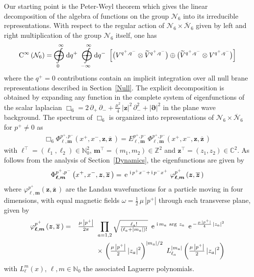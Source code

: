\documentclass[11pt,a4paper]{article}
\newcommand{\ii}{{\rm i}}
\newcommand{\mbf}[1]{{\boldsymbol {#1} }}
\def\ii{{\,{\rm i}\,}}
\def\dd{{\rm d}}
\def\mz{{\mbf z}}
\def\mm{{\mbf m}}
\def\mell{{\mbf\ell}}
\def\mdell{{\mbf\partial}}
\newcommand{\complex}{{\mathbb C}} %
\newcommand{\zed}{{\mathbb Z}} %
\newcommand{\nat}{{\mathbb N}} %
\def\e{{\,\rm e}\,}
\def\bea{\begin{eqnarray}}
\def\eea{\end{eqnarray}}
\newcommand{\beq}{\begin{eqnarray}}
\newcommand{\eeq}{\end{eqnarray}}
\begin{document}
Our starting point is the Peter-Weyl theorem which gives the
linear decomposition of the algebra of functions on the group $\mathcal{N}_6$
into its irreducible representations. With respect to the regular
action of $\mathcal{N}_6\times\overline{\mathcal{N}}_6$ given by left
and right multiplication of the group $\mathcal{N}_6$ itself, one has
\beq
{\rm C}^\infty\left(\mathcal{N}_6\right)=~{\int\limits_0^\infty
\!\!\!\!\!\!\!\!\!\!\!\!~\,\bigodot\!\!\!\!\!\!\!\!\!\!\mbf-\!\!
\mbf-}~\dd q^+~~{\int\limits_{-\infty}^\infty
\!\!\!\!\!\!\!\!\!\!\!\!~\bigodot\!\!\!\!\!\!\!\!\!\!\mbf-\!\!
\mbf-}~\dd q^-~\left[\bigl(V^{q^+,q^-}\otimes\widetilde{V}
{}^{q^+,q^-}\bigr)\oplus\bigl(\widetilde{V}
{}^{q^+,q^-}\otimes V^{q^+,q^-}\bigr)\right]
\label{PeterWeylthm}\eeq
where the $q^+=0$ contributions contain an implicit integration over all null
brane representations described in Section~\ref{Null}. The explicit
decomposition is obtained by expanding any function in the complete
system of eigenfunctions of the scalar laplacian
$\Box_6=2\,\partial_+\,\partial_-+\frac{\mu^2}4\,|\mz|^2\,
\partial_-^2+|\mdell|^2$ in the plane wave background. The spectrum of
$\Box_6$ is organized into representations of
$\mathcal{N}_6\times\overline{\mathcal{N}}_6$ for $p^+\neq0$ as
\beq
\Box_6\Phi_{\mell,\mm}^{p^+,p^-}\left(x^+,x^-,\mz,\overline{\mz}\,\right)=
E_{\mell,\mm}^{p^+,p^-}\,\Phi_{\mell,\mm}^{p^+,p^-}\left(x^+,x^-,\mz,
\overline{\mz}\,\right)
\label{Box6eigeneq}\eeq
with $\mell^\top=(\ell_1,\ell_2)\in\nat_0^2$, $\mm^\top=(m_1,m_2)\in\zed^2$ and
$\mz^\top=(z_1,z_2)\in\complex^2$. As follows from the analysis of
Section~\ref{Dynamics}, the eigenfunctions are given by
\beq
\Phi_{\mell,\mm}^{p^+,p^-}\left(x^+,x^-,\mz,\overline{\mz}\,\right)=
\e^{\ii p^+x^-+\ii
  p^-x^+}~\varphi^{p^+}_{\mell,\mm}\left(\mz,\overline{\mz}\,\right)
\label{Box6eigenfns}\eeq
where $\varphi^{p^+}_{\mell,\mm}(\mz,\overline{\mz}\,)$ are the Landau
wavefunctions for a particle moving in four dimensions, with equal
magnetic fields $\omega=\frac12\,\mu\,|p^+|$ through each transverse
plane, given by
\bea
\varphi^{p^+}_{\mell,\mm}\left(\mz,\overline{\mz}\,\right)&=&
\mbox{$\frac{\mu\,\left|p^+\right|}{2\pi}$}~
\prod_{a=1,2}\sqrt{\mbox{$\frac{\ell_a!}{(\ell_a+|m_a|)!}$}}~
\e^{\ii m_a~{\rm arg}~z_a}~\e^{-\frac{\mu\,|p^+|}4\,|z_a|^2}\nonumber\\&&
\times\,\left(\mbox{$\frac{\mu\,\left|p^+\right|}2$}\,|z_a|^2\right)^{|m_a|/2}~
L_{\ell_a}^{|m_a|}\left(\mbox{$\frac{\mu\,\left|p^+\right|}2$}\,|z_a|^2\right)
\label{Landauwavefns}\eea
with $L_\ell^m(x)$, $\ell,m\in\nat_0$ the associated Laguerre
polynomials.
\end{document}
